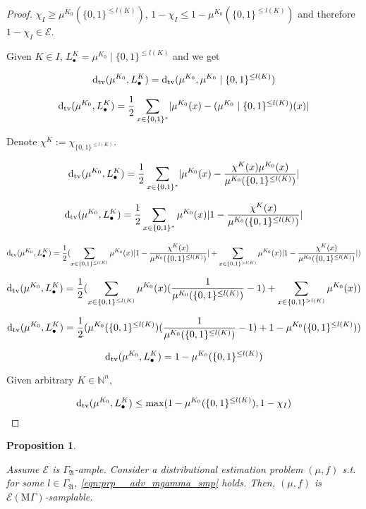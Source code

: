 \documentclass{article}
\numberwithin{equation}{section}
\theoremstyle{definition}
\theoremstyle{plain}
\newtheorem{proposition}{Proposition}[section]
\newcommand{\Bool}{\{0,1\}}
\newcommand{\Words}{{\Bool^*}}
\newcommand{\WordsLen}[1]{{\Bool^{#1}}}
\newcommand{\Dtv}{\operatorname{d}_{\textnormal{tv}}}
\newcommand{\Nats}{\mathbb{N}}
\newcommand{\Abs}[1]{\lvert #1 \rvert}
\newcommand{\GrowA}{\Gamma_{\mathfrak{A}}}
\newcommand{\MGrow}{\mathrm{M}\Gamma}
\newcommand{\Fall}{\mathcal{E}}
\newcommand{\EMG}{\Fall(\MGrow)}
\begin{document}
\begin{proof}

$\chi_I \geq \mu^{K_0}(\Bool^{\leq l(K)})$, $1 - \chi_{I} \leq 1 - \mu^{K_0}(\Bool^{\leq l(K)})$ and therefore $1 - \chi_I \in \Fall$.

Given $K \in I$, ${L_\bullet^K = \mu^{K_0} \mid \Bool^{\leq l(K)}}$ and we get

$$\Dtv(\mu^{K_0}, L_\bullet^K) = \Dtv(\mu^{K_0}, \mu^{K_0} \mid \Bool^{\leq l(K)})$$

$$\Dtv(\mu^{K_0}, L_\bullet^K) = \frac{1}{2} \sum_{x \in \Words} \Abs{\mu^{K_0}(x)-(\mu^{K_0} \mid \WordsLen{\leq l(K)})(x)}$$

Denote $\chi^K:=\chi_{\WordsLen{\leq l(K)}}$.

$$\Dtv(\mu^{K_0}, L_\bullet^K) = \frac{1}{2} \sum_{x \in \Words} \Abs{\mu^{K_0}(x)-\frac{\chi^K(x)\mu^{K_0}(x)}{\mu^{K_0}(\WordsLen{\leq l(K)})}}$$

$$\Dtv(\mu^{K_0}, L_\bullet^K) = \frac{1}{2} \sum_{x \in \Words} \mu^{K_0}(x) \Abs{1-\frac{\chi^K(x)}{\mu^{K_0}(\Bool^{\leq l(K)})}}$$

$$\Dtv(\mu^{K_0}, L_\bullet^K) = \frac{1}{2} (\sum_{x \in \Bool^{\leq l(K)}} \mu^{K_0}(x) \Abs{1-\frac{\chi^K(x)}{\mu^{K_0}(\Bool^{\leq l(K)})}}+\sum_{x \in \Bool^{>l(K)}} \mu^{K_0}(x) \Abs{1-\frac{\chi^K(x)}{\mu^{K_0}(\Bool^{\leq l(K)})}})$$

$$\Dtv(\mu^{K_0}, L_\bullet^K) = \frac{1}{2} (\sum_{x \in \Bool^{\leq l(K)}} \mu^{K_0}(x)(\frac{1}{\mu^{K_0}(\Bool^{\leq l(K)})}-1)+\sum_{x \in \Bool^{>l(K)}} \mu^{K_0}(x))$$

$$\Dtv(\mu^{K_0}, L_\bullet^K) = \frac{1}{2} (\mu^{K_0}(\Bool^{\leq l(K)})(\frac{1}{\mu^{K_0}(\Bool^{\leq l(K)})}-1)+1 - \mu^{K_0}(\Bool^{\leq l(K)}))$$

$$\Dtv(\mu^{K_0}, L_\bullet^K) = 1-\mu^{K_0}(\Bool^{\leq l(K)})$$

Given arbitrary $K \in \Nats^n$,

$$\Dtv(\mu^{K_0}, L_\bullet^K) \leq \max(1-\mu^{K_0}(\Bool^{\leq l(K)}), 1-\chi_I)$$
\end{proof}

\begin{samepage}
\begin{proposition}
\label{prp:adv_mgamma_gen}

Assume $\Fall$ is $\GrowA$-ample. Consider a distributional estimation problem $(\mu,f)$ s.t. for some $l \in \GrowA$, \ref{eqn:prp__adv_mgamma_smp} holds. Then, $(\mu,f)$ is $\EMG$-samplable. 

\end{proposition}
\end{samepage}
\end{document}

